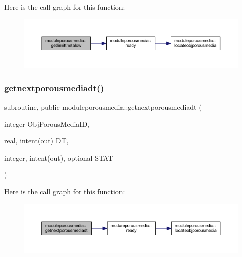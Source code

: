Here is the call graph for this function\+:\nopagebreak
\begin{figure}[H]
\begin{center}
\leavevmode
\includegraphics[width=350pt]{namespacemoduleporousmedia_a3070d5af7ef46dbbb22e63098a25f566_cgraph}
\end{center}
\end{figure}
\mbox{\label{namespacemoduleporousmedia_a97ffb3238bf0364c7e0c3e30fe5b7021}} 
\subsubsection{\texorpdfstring{getnextporousmediadt()}{getnextporousmediadt()}}
{\footnotesize\ttfamily subroutine, public moduleporousmedia\+::getnextporousmediadt (\begin{DoxyParamCaption}\item[{integer}]{Obj\+Porous\+Media\+ID,  }\item[{real, intent(out)}]{DT,  }\item[{integer, intent(out), optional}]{S\+T\+AT }\end{DoxyParamCaption})}

Here is the call graph for this function\+:\nopagebreak
\begin{figure}[H]
\begin{center}
\leavevmode
\includegraphics[width=350pt]{namespacemoduleporousmedia_a97ffb3238bf0364c7e0c3e30fe5b7021_cgraph}
\end{center}
\end{figure}
\mbox{\label{namespacemoduleporousmedia_a2b7e324655161146b0aaf1af3e684670}} 
